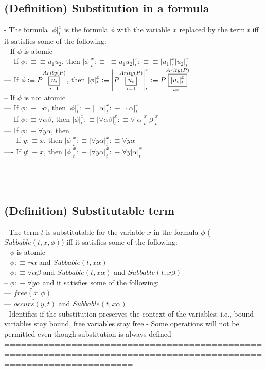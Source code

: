 \documentclass{book}
\newcommand{\is}{:\equiv}
\newcommand{\pnot}[1]{\widetilde{#1}}
\newcommand{\inot}{\not}
\newcommand{\occurs}[2]{occurs(#1, #2)}
\newcommand{\free}[2]{free(#1, #2)}
\newcommand{\vdc}[3]{\underset{#2}{\overset{#3}{\fbox{$#1$}}}}
\newcommand{\sub}[3]{\left|#1\right|_{#3}^{#2}}
\begin{document}
\subsection{(Definition) Substitution in a formula} %
	- The formula $\sub{\phi}{x}{t}$ is the formula $\phi$ with the variable $x$ replaced by the term $t$ iff it satisfies some of the following: \\
		-- If $\phi$ is atomic \\
			--- If $\phi \is \equiv u_1 u_2$, then $\sub{\phi}{x}{t} \is \sub{\equiv u_1 u_2}{x}{t} \is \equiv \sub{u_1}{x}{t} \sub{u_2}{x}{t}$ \\
		--- If $\phi \is P \vdc{u_i}{i=1}{Arity(P)}$, then $\sub{\phi}{x}{t} \is \sub{P \vdc{u_i}{i=1}{Arity(P)}}{x}{t} \is P \vdc{\sub{u_i}{x}{t}}{i=1}{Arity(P)}$ \\
		-- If $\phi$ is not atomic \\
			--- If $\phi \is \lnot \alpha$, then $\sub{\phi}{x}{t} \is \sub{\lnot \alpha}{x}{t} \is \lnot \sub{\alpha}{x}{t}$ \\
			--- If $\phi \is \lor \alpha \beta$, then $\sub{\phi}{x}{t} \is \sub{\lor \alpha \beta}{x}{t} \is \lor \sub{\alpha}{x}{t} \sub{\beta}{x}{t}$ \\
			--- If $\phi \is \forall y \alpha$, then \\
				---- If $y \is x$, then $\sub{\phi}{x}{t} \is \sub{\forall y \alpha}{x}{t} \is \forall y \alpha$ \\
				---- If $y \inot \is x$, then $\sub{\phi}{x}{t} \is \sub{\forall y \alpha}{x}{t} \is \forall y \sub{\alpha}{x}{t}$ \\
	===================================================================================================================
\subsection{(Definition) Substitutable term} %
	- The term $t$ is substitutable for the variable $x$ in the formula $\phi$ ($Subbable(t, x, \phi)$) iff it satisfies some of the following: \\
		-- $\phi$ is atomic \\
		-- $\phi \is \lnot \alpha$ and $Subbable(t, x \alpha)$ \\
		-- $\phi \is \lor \alpha \beta$ and $Subbable(t, x \alpha)$ and $Subbable(t, x \beta)$ \\
		-- $\phi \is \forall y \alpha$ and it satisfies some of the following: \\
			--- $\pnot{\free{x}{\phi}}$ \\
			--- $\pnot{\occurs{y}{t}}$ and $Subbable(t, x \alpha)$ \\
	- Identifies if the substitution preserves the context of the variables; i.e., bound variables stay bound, free variables stay free
	- Some operations will not be permitted even though substitution is always defined \\
	===================================================================================================================
\end{document}
